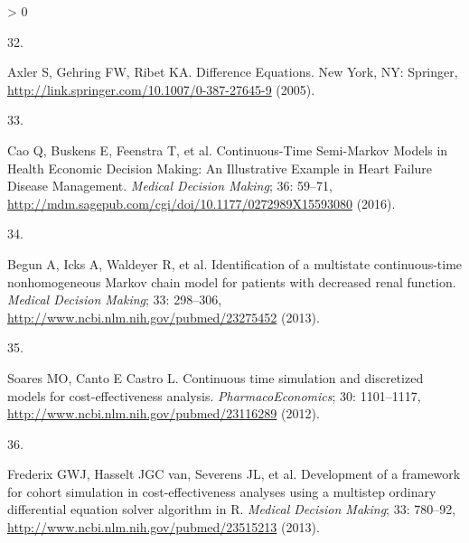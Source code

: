 \documentclass[
]{article}
\newlength{\cslhangindent}
\newlength{\csllabelwidth}
\newenvironment{CSLReferences}[2] %
 {%
  \setlength{\parindent}{0pt}
  \ifodd #1 \everypar{\setlength{\hangindent}{\cslhangindent}}\ignorespaces\fi
  \ifnum #2 > 0
  \setlength{\parskip}{#2\baselineskip}
  \fi
 }%
 {}
\newcommand{\CSLLeftMargin}[1]{\parbox[t]{\csllabelwidth}{#1}}
\newcommand{\CSLRightInline}[1]{\parbox[t]{\linewidth - \csllabelwidth}{#1}\break}
\begin{document}
\begin{CSLReferences}{0}{0}
\leavevmode\hypertarget{ref-Axler2005}{}%
\CSLLeftMargin{32. }
\CSLRightInline{Axler S, Gehring FW, Ribet KA. {Difference Equations}. New York, NY: Springer, \url{http://link.springer.com/10.1007/0-387-27645-9} (2005).}

\leavevmode\hypertarget{ref-Cao2016}{}%
\CSLLeftMargin{33. }
\CSLRightInline{Cao Q, Buskens E, Feenstra T, et al. {Continuous-Time Semi-Markov Models in Health Economic Decision Making: An Illustrative Example in Heart Failure Disease Management}. \emph{Medical Decision Making}; 36: 59--71, \url{http://mdm.sagepub.com/cgi/doi/10.1177/0272989X15593080} (2016).}

\leavevmode\hypertarget{ref-Begun2013}{}%
\CSLLeftMargin{34. }
\CSLRightInline{Begun A, Icks A, Waldeyer R, et al. {Identification of a multistate continuous-time nonhomogeneous Markov chain model for patients with decreased renal function.} \emph{Medical Decision Making}; 33: 298--306, \url{http://www.ncbi.nlm.nih.gov/pubmed/23275452} (2013).}

\leavevmode\hypertarget{ref-Soares2012}{}%
\CSLLeftMargin{35. }
\CSLRightInline{Soares MO, Canto E Castro L. {Continuous time simulation and discretized models for cost-effectiveness analysis}. \emph{PharmacoEconomics}; 30: 1101--1117, \url{http://www.ncbi.nlm.nih.gov/pubmed/23116289} (2012).}

\leavevmode\hypertarget{ref-Frederix2013a}{}%
\CSLLeftMargin{36. }
\CSLRightInline{Frederix GWJ, Hasselt JGC van, Severens JL, et al. {Development of a framework for cohort simulation in cost-effectiveness analyses using a multistep ordinary differential equation solver algorithm in R.} \emph{Medical Decision Making}; 33: 780--92, \url{http://www.ncbi.nlm.nih.gov/pubmed/23515213} (2013).}

\end{CSLReferences}
\end{document}
